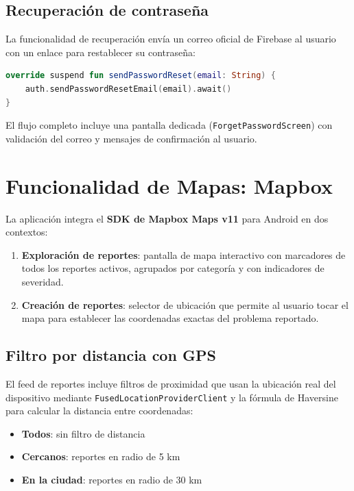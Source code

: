 \documentclass[12pt,a4paper]{article}
\begin{document}
\subsection{Recuperación de contraseña}

La funcionalidad de recuperación envía un correo oficial de Firebase al usuario con un enlace para restablecer su contraseña:

\begin{lstlisting}[language=Kotlin, caption={Envío de correo de recuperación}]
override suspend fun sendPasswordReset(email: String) {
    auth.sendPasswordResetEmail(email).await()
}
\end{lstlisting}

El flujo completo incluye una pantalla dedicada (\texttt{ForgetPasswordScreen}) con validación del correo y mensajes de confirmación al usuario.

\section{Funcionalidad de Mapas: Mapbox}

La aplicación integra el \textbf{SDK de Mapbox Maps v11} para Android en dos contextos:

\begin{enumerate}[leftmargin=1.5em]
    \item \textbf{Exploración de reportes}: pantalla de mapa interactivo con marcadores de todos los reportes activos, agrupados por categoría y con indicadores de severidad.
    \item \textbf{Creación de reportes}: selector de ubicación que permite al usuario tocar el mapa para establecer las coordenadas exactas del problema reportado.
\end{enumerate}

\subsection{Filtro por distancia con GPS}

El feed de reportes incluye filtros de proximidad que usan la ubicación real del dispositivo mediante \texttt{FusedLocationProviderClient} y la fórmula de Haversine para calcular la distancia entre coordenadas:

\begin{itemize}[leftmargin=1.5em]
    \item \textbf{Todos}: sin filtro de distancia
    \item \textbf{Cercanos}: reportes en radio de 5 km
    \item \textbf{En la ciudad}: reportes en radio de 30 km
\end{itemize}
\end{document}
